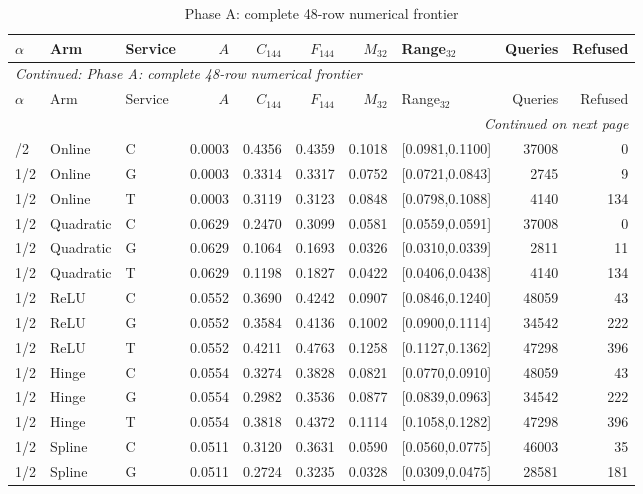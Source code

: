 \begingroup\footnotesize\setlength{\tabcolsep}{3pt}
\begin{longtable}{lllrrrrlrr}
\caption{Phase A: complete 48-row numerical frontier}\label{tab:frontier119a}\\
\toprule
$\alpha$ & Arm & Service & $A$ & $C_{144}$ & $F_{144}$ & $M_{32}$ & Range$_{32}$ & Queries & Refused\\\midrule
\endfirsthead
\multicolumn{10}{l}{\textit{Continued: Phase A: complete 48-row numerical frontier}}\\
\toprule
$\alpha$ & Arm & Service & $A$ & $C_{144}$ & $F_{144}$ & $M_{32}$ & Range$_{32}$ & Queries & Refused\\\midrule
\endhead
\midrule\multicolumn{10}{r}{\textit{Continued on next page}}\\
\endfoot
\bottomrule
\endlastfoot
1/2 & Online & C & 0.0003 & 0.4356 & 0.4359 & 0.1018 & [0.0981,0.1100] & 37008 & 0 \\
1/2 & Online & G & 0.0003 & 0.3314 & 0.3317 & 0.0752 & [0.0721,0.0843] & 2745 & 9 \\
1/2 & Online & T & 0.0003 & 0.3119 & 0.3123 & 0.0848 & [0.0798,0.1088] & 4140 & 134 \\
1/2 & Quadratic & C & 0.0629 & 0.2470 & 0.3099 & 0.0581 & [0.0559,0.0591] & 37008 & 0 \\
1/2 & Quadratic & G & 0.0629 & 0.1064 & 0.1693 & 0.0326 & [0.0310,0.0339] & 2811 & 11 \\
1/2 & Quadratic & T & 0.0629 & 0.1198 & 0.1827 & 0.0422 & [0.0406,0.0438] & 4140 & 134 \\
1/2 & ReLU & C & 0.0552 & 0.3690 & 0.4242 & 0.0907 & [0.0846,0.1240] & 48059 & 43 \\
1/2 & ReLU & G & 0.0552 & 0.3584 & 0.4136 & 0.1002 & [0.0900,0.1114] & 34542 & 222 \\
1/2 & ReLU & T & 0.0552 & 0.4211 & 0.4763 & 0.1258 & [0.1127,0.1362] & 47298 & 396 \\
1/2 & Hinge & C & 0.0554 & 0.3274 & 0.3828 & 0.0821 & [0.0770,0.0910] & 48059 & 43 \\
1/2 & Hinge & G & 0.0554 & 0.2982 & 0.3536 & 0.0877 & [0.0839,0.0963] & 34542 & 222 \\
1/2 & Hinge & T & 0.0554 & 0.3818 & 0.4372 & 0.1114 & [0.1058,0.1282] & 47298 & 396 \\
1/2 & Spline & C & 0.0511 & 0.3120 & 0.3631 & 0.0590 & [0.0560,0.0775] & 46003 & 35 \\
1/2 & Spline & G & 0.0511 & 0.2724 & 0.3235 & 0.0328 & [0.0309,0.0475] & 28581 & 181 \\

\end{longtable}
